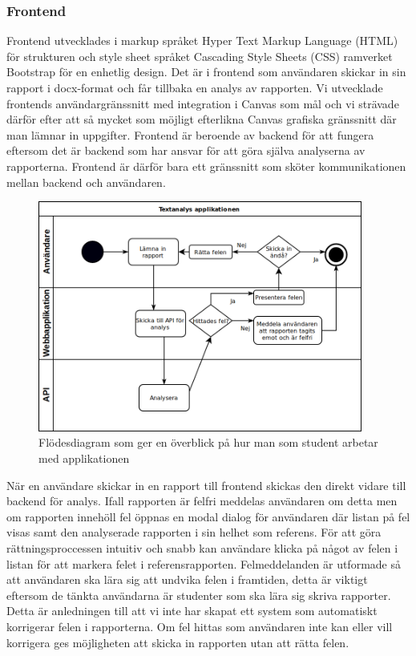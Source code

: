 \documentclass[swedish]{maucsthesis}
\begin{document}
\subsubsection{Frontend}

Frontend utvecklades i markup språket Hyper Text Markup Language (HTML) för
strukturen och style sheet språket Cascading Style Sheets (CSS) ramverket
Bootstrap för en enhetlig design. Det är i frontend som användaren skickar in
sin rapport i docx-format och får tillbaka en analys av rapporten. Vi utvecklade
frontends användargränssnitt med integration i Canvas som mål och vi strävade
därför efter att så mycket som möjligt efterlikna Canvas grafiska gränssnitt
där man lämnar in uppgifter. Frontend är beroende av backend för att fungera
eftersom det är backend som har ansvar för att göra själva analyserna av
rapporterna. Frontend är därför bara ett gränssnitt som sköter kommunikationen
mellan backend och användaren.

\begin{figure}[H]
    \centering
    \includegraphics[width=0.95\textwidth]{overviewflow.png}
    \caption{Flödesdiagram som ger en överblick på hur man som student arbetar
      med applikationen}
    \label{fig:overviewflow}
\end{figure}

När en användare skickar in en rapport till frontend skickas den direkt vidare
till backend för analys. Ifall rapporten är felfri meddelas användaren om detta
men om rapporten innehöll fel öppnas en modal dialog för användaren där listan
på fel visas samt den analyserade rapporten i sin helhet som referens. För att
göra rättningsproccessen intuitiv och snabb kan användare klicka på något av
felen i listan för att markera felet i referensrapporten. Felmeddelanden är
utformade så att användaren ska lära sig att undvika felen i framtiden, detta är
viktigt eftersom de tänkta användarna är studenter som ska lära sig skriva
rapporter. Detta är anledningen till att vi inte har skapat ett system som
automatiskt korrigerar felen i rapporterna. Om fel hittas som användaren inte
kan eller vill korrigera ges möjligheten att skicka in rapporten utan att rätta
felen.
\end{document}
